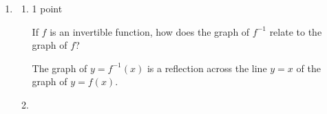 \documentclass{article}
\begin{document}
\begin{enumerate}
\begin{enumerate}
  \item
    \begin{problem}[\vfill]
      $f'(100)$
    \end{problem}

    \begin{solution}
      $f'(100)$ is the rate (in minutes per degree Celsius) 
      at which the time it takes for the roast beef to cook would change
      in response to a change in the oven temperature, when the oven temperature is
      $100$ $^\circ$C. This will be negative, as an increase in the oven temperature
      will result in a decrease in the cooking time.
      
    \end{solution}

  \item
    \begin{problem}[\vfill]
      $f^{-1}(100)$
    \end{problem}

    \begin{solution}
      $f^{-1}(100)$ is the temperature (in degrees Celsius) at which the oven
      should be set to cook the roast beef in $100$ minutes. This will be positive,
      as a negative temperature will not cook the beef.
    \end{solution}

  \end{enumerate}

\item  

  \begin{enumerate}
  \item \label{graphs-of-function-and-inverse}

    \begin{grading}
      1 point
    \end{grading}

    \begin{problem}[\vfill\newpage]
      If $f$ is an invertible function, how does the graph of $f^{-1}$
      relate to the graph of $f$? 
    \end{problem}

    \begin{solution}
      The graph of $y=f^{-1}(x)$ is a reflection across the line $y=x$ of the graph of
      $y=f(x)$.
    \end{solution}

  \item \label{based-on-gottlieb-12.1.3}


\end{enumerate}
\end{enumerate}
\end{document}

